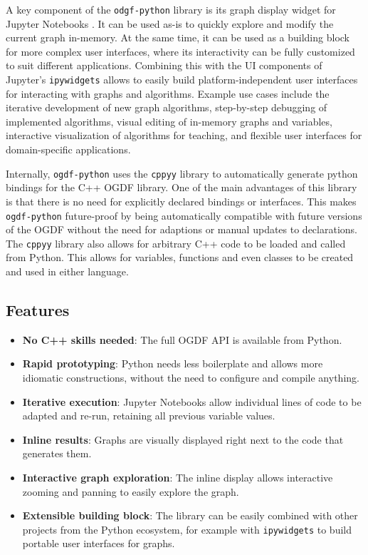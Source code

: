 \documentclass{llncs}
\begin{document}
A key component of the \texttt{odgf-python} library is its graph display widget for Jupyter Notebooks \cite{str-agw-22}.
It can be used as-is to quickly explore and modify the current graph in-memory.
At the same time, it can be used as a building block for more complex user interfaces, where its interactivity can be fully customized to suit different applications.
Combining this with the UI components of Jupyter's \texttt{ipywidgets} allows to easily build platform-independent user interfaces for interacting with graphs and algorithms.
Example use cases include the iterative development of new graph algorithms,
step-by-step debugging of implemented algorithms,
visual editing of in-memory graphs and variables,
interactive visualization of algorithms for teaching, and 
flexible user interfaces for domain-specific applications.

Internally, \texttt{ogdf-python} uses the \texttt{cppyy} library \cite{ld-hpp-16,kvl-eaa-23} to automatically generate python bindings for the C++ OGDF library.
One of the main advantages of this library is that there is no need for explicitly declared bindings or interfaces.
This makes \texttt{ogdf-python} future-proof by being automatically compatible with future versions of the OGDF without the need for adaptions or manual updates to declarations.
The \texttt{cppyy} library also allows for arbitrary C++ code to be loaded and called from Python.
This allows for variables, functions and even classes to be created and used in either language.

\subsection*{Features}
\begin{itemize}
\item \textbf{No C++ skills needed}: The full OGDF API is available from Python.
\item \textbf{Rapid prototyping}: Python needs less boilerplate and allows more idiomatic constructions, 
  without the need to configure and compile anything.
\item \textbf{Iterative execution}: Jupyter Notebooks allow individual lines of code to be adapted and re-run,
  retaining all previous variable values.
\item \textbf{Inline results}: Graphs are visually displayed right next to the code that generates them.
\item \textbf{Interactive graph exploration}: The inline display allows interactive zooming and panning to easily explore the graph.
\item \textbf{Extensible building block}: The library can be easily combined with other projects from the Python ecosystem, for example with \texttt{ipywidgets} to build portable user interfaces for graphs.
\end{itemize}
\end{document}
